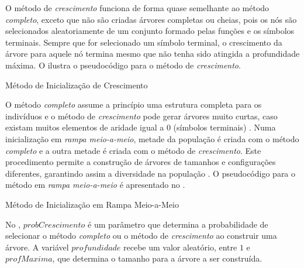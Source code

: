 O método de \emph{crescimento} funciona de forma quase semelhante ao método \emph{completo}, exceto que não são criadas árvores completas 
ou cheias, pois os nós são selecionados aleatoriamente de um conjunto formado pelas funções e os símbolos terminais. Sempre que 
for selecionado um símbolo terminal, o crescimento da árvore para aquele nó termina mesmo que não tenha sido atingida a profundidade 
máxima. O  ilustra o pseudocódigo para o método de \emph{crescimento}.

\begin{algorithm}[H]
	\caption{Método de Inicialização de Crescimento}
	\label{Algoritmo232}
	\begin{algorithmic}[1]
			\Else
				\EndFor
			\EndIf
			\State {}
		\EndFunction
	\end{algorithmic}
\end{algorithm}

O método \emph{completo} assume a princípio uma estrutura completa para os indivíduos e o método de \emph{crescimento} pode gerar árvores muito 
curtas, caso existam muitos elementos de aridade igual a $0$ (símbolos terminais) \citep{Poli2008}. Numa inicialização em 
\emph{rampa meio-a-meio}, metade da população é criada com o método \emph{completo} e a outra metade é criada com o método de 
\emph{crescimento}. Este procedimento permite a construção de árvores de tamanhos e configurações diferentes, garantindo assim 
a diversidade na população \citep{Koza1992}. O pseudocódigo para o método em \emph{rampa meio-a-meio} é apresentado no .

\begin{algorithm}[H]
	\caption{Método de Inicialização em Rampa Meio-a-Meio}
	\label{Algoritmo233}
	\begin{algorithmic}[1]
				\State {}
			\Else
				\State {}
			\EndIf
		\EndFunction
	\end{algorithmic}
\end{algorithm}

No , $probCrescimento$ é um parâmetro que determina a probabilidade de selecionar o método 
\emph{completo} ou o método
de \emph{crescimento} ao construir uma árvore. A variável $profundidade$ recebe um valor aleatório, entre
$1$ e $profMaxima$, que determina o tamanho para a árvore a ser construída.